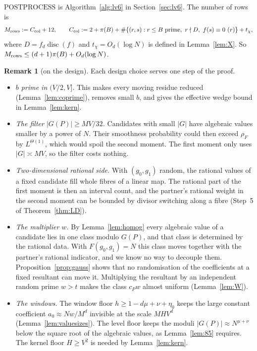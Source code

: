 \documentclass[11pt]{amsart}
\theoremstyle{definition}
\newtheorem{remark}[theorem]{Remark}
\newcommand{\rF}{\rho_F}
\newcommand{\disc}{\operatorname{disc}}
\begin{document}
\noindent $\mathrm{POSTPROCESS}$ is Algorithm~\ref{alg:lv6} in Section~\ref{sec:lv6}. The number of rows is
\begin{equation}\label{eq:Mrows}
M_{\rm rows}:=C_{\rm col}+12,\qquad C_{\rm col}:=2+\pi(B)+\#\{(r,s):r\le B\text{ prime},\ r\nmid D,\ f(s)\equiv0\ (r)\}+t_\chi,
\end{equation}
where $D=f_d\disc(f)$ and $t_\chi=O_d(\log N)$ is defined in Lemma~\ref{lem:X}. So $M_{\rm rows}\le(d+1)\pi(B)+O_d(\log N)$.

\begin{remark}[on the design]\label{rem:design}
Each design choice serves one step of the proof.
\begin{itemize}
\item \emph{$b$ prime in $(V/2,V]$.} This makes every moving residue reduced (Lemma~\ref{lem:coprime}), removes
  small $b$, and gives the effective wedge bound in Lemma~\ref{lem:kern}.
\item \emph{The filter $|G(P)|\ge MV/32$.} Candidates with small $|G|$ have algebraic values smaller by a power of $N$.
  Their smoothness probability could then exceed $\rF$ by $L^{\Theta(1)}$, which would spoil the second
  moment. The first moment only uses $|G|\asymp MV$, so the filter costs nothing.
\item \emph{Two-dimensional rational side.} With $(g_0,g_1)$ random, the rational values of a fixed candidate
  fill whole fibres of a linear map. The rational part of the first moment is then an interval count,
  and the partner's rational weight in the second moment can be bounded by divisor switching along a
  fibre (Step~5 of Theorem~\ref{thm:LD}).
\item \emph{The multiplier $w$.} By Lemma~\ref{lem:homog} every algebraic value of a candidate lies in one class
  modulo $G(P)$, and that class is determined by the rational data. With $F(g_0,g_1)=N$ this class
  moves together with the partner's rational indicator, and we know no way to decouple them.
  Proposition~\ref{prop:gauss} shows that no randomisation of the coefficients at a fixed resultant can move it. Multiplying the resultant
  by an independent random prime $w>t$ makes the class $c_Pw$ almost uniform (Lemma~\ref{lem:W}).
\item \emph{The windows.} The window floor $h\ge1-d\mu+\nu+\eta_0$ keeps the large constant coefficient
  $a_0\approx Nw/M^d$ invisible at the scale $MHV^d$ (Lemma~\ref{lem:valuesizes}). The level floor keeps the moduli
  $|G(P)|\approx N^{\mu+\nu}$ below the square root of the algebraic values, as Lemma~\ref{lem:85} requires. The
  kernel floor $H\ge V^2$ is needed by Lemma~\ref{lem:kern}.
\end{itemize}
\end{remark}
\end{document}
